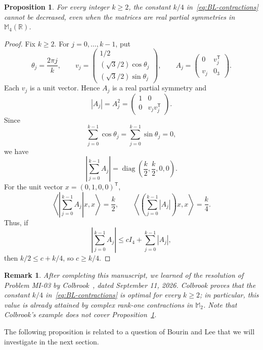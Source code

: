 \documentclass[11pt]{amsart}
\numberwithin{equation}{section}
\newtheorem{proposition}[theorem]{Proposition}
\newtheorem{remark}[theorem]{Remark}
\newcommand{\diag}{\operatorname{diag}}
\begin{document}
\begingroup

\begin{proposition}\label{cor:k-over-four}
For every integer $k\geq2$, the constant $k/4$
in~\eqref{eq:BL-contractions} cannot be decreased, even when
the matrices are real partial symmetries in
$\mathbb M_4(\mathbb R)$.
\end{proposition}

\begin{proof}
Fix $k\geq2$. For $j=0,\ldots,k-1$, put
\[
 \theta_j=\frac{2\pi j}{k},
 \qquad
 v_j=
 \begin{pmatrix}
  1/2\\
  (\sqrt3/2)\cos\theta_j\\
  (\sqrt3/2)\sin\theta_j
 \end{pmatrix},
 \qquad
 A_j=
 \begin{pmatrix}
  0&v_j^{\mathsf T}\\
  v_j&0_3
 \end{pmatrix}.
\]
Each $v_j$ is a unit vector. Hence $A_j$ is a real
partial symmetry and
\[
 |A_j|=A_j^2=
 \begin{pmatrix}
  1&0\\
  0&v_jv_j^{\mathsf T}
 \end{pmatrix}.
\]
Since
\[
 \sum_{j=0}^{k-1}\cos\theta_j
 =
 \sum_{j=0}^{k-1}\sin\theta_j
 =0,
\]
we have
\[
 \left|\sum_{j=0}^{k-1}A_j\right|
 =
 \diag\left(\frac{k}{2},\frac{k}{2},0,0\right).
\]
For the unit vector $x=(0,1,0,0)^{\mathsf T}$,
\[
 \left\langle
 \left|\sum_{j=0}^{k-1}A_j\right|x,x
 \right\rangle=\frac{k}{2},
 \qquad
 \left\langle
 \left(\sum_{j=0}^{k-1}|A_j|\right)x,x
 \right\rangle=\frac{k}{4}.
\]
Thus, if
\[
 \left|\sum_{j=0}^{k-1}A_j\right|
 \leq cI_4+\sum_{j=0}^{k-1}|A_j|,
\]
then $k/2\leq c+k/4$, so $c\geq k/4$.
\end{proof}
\endgroup


\begin{remark}\label{rem:colbrook}
After completing this manuscript, we learned of the resolution
of Problem MI-03 by Colbrook~\cite{ColbrookMI03}, dated
September 11, 2026. Colbrook proves that the constant $k/4$
in~\eqref{eq:BL-contractions} is optimal for every $k\geq2$;
in particular, this value is already attained by complex
rank-one contractions in $\mathbb M_2$.
Note that Colbrook's example does not cover
Proposition~\ref{cor:k-over-four}.
\end{remark}


The following proposition is related to a question of Bourin and Lee that we will  investigate in the next section.
\end{document}
